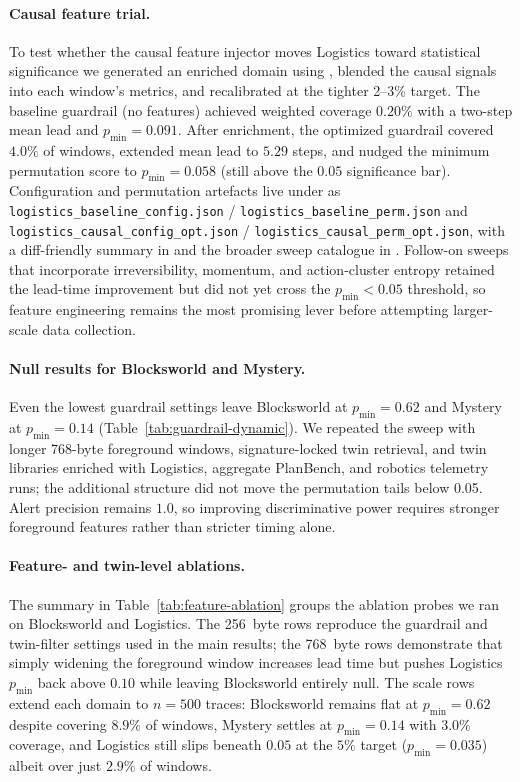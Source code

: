 \documentclass[11pt]{article}
\begin{document}
\paragraph{Causal feature trial.} To test whether the causal feature injector moves Logistics toward
statistical significance we generated an enriched domain using
, blended the causal signals into
each window's metrics, and recalibrated at the tighter 2--3\% target. The baseline
guardrail (no features) achieved weighted coverage $0.20\%$ with a two-step mean lead and
$p_{\min}=0.091$. After enrichment, the optimized guardrail covered $4.0\%$ of windows,
extended mean lead to $5.29$ steps, and nudged the minimum permutation score to
$p_{\min}=0.058$ (still above the $0.05$ significance bar). Configuration and
permutation artefacts live under  as
\texttt{logistics\_baseline\_config.json} / \texttt{logistics\_baseline\_perm.json} and
\texttt{logistics\_causal\_config\_opt.json} / \texttt{logistics\_causal\_perm\_opt.json}, with a
diff-friendly summary in  and the broader
sweep catalogue in . Follow-on sweeps that
incorporate irreversibility, momentum, and action-cluster entropy retained the
lead-time improvement but did not yet cross the $p_{\min} < 0.05$ threshold, so
feature engineering remains the most promising lever before attempting larger-scale data
collection.

\paragraph{Null results for Blocksworld and Mystery.} Even the lowest guardrail
settings leave Blocksworld at $p_{\min}=0.62$ and Mystery at
$p_{\min}=0.14$ (Table~\ref{tab:guardrail-dynamic}). We repeated the sweep with
longer 768-byte foreground windows, signature-locked twin retrieval, and twin
libraries enriched with Logistics, aggregate PlanBench, and robotics telemetry
runs; the additional structure did not move the permutation tails below 0.05.
Alert precision remains $1.0$, so improving discriminative power requires
stronger foreground features rather than stricter timing alone.

\paragraph{Feature- and twin-level ablations.} The summary in
Table~\ref{tab:feature-ablation} groups the ablation probes we ran on
Blocksworld and Logistics. The 256~byte rows reproduce the guardrail and
twin-filter settings used in the main results; the 768~byte rows demonstrate
that simply widening the foreground window increases lead time but pushes Logistics
$p_{\min}$ back above $0.10$ while leaving Blocksworld entirely null. The scale
rows extend each domain to $n=500$ traces: Blocksworld remains flat at
$p_{\min}=0.62$ despite covering $8.9\%$ of windows, Mystery settles at
$p_{\min}=0.14$ with $3.0\%$ coverage, and Logistics still slips beneath $0.05$
at the $5\%$ target ($p_{\min}=0.035$) albeit over just $2.9\%$ of windows.
\end{document}
